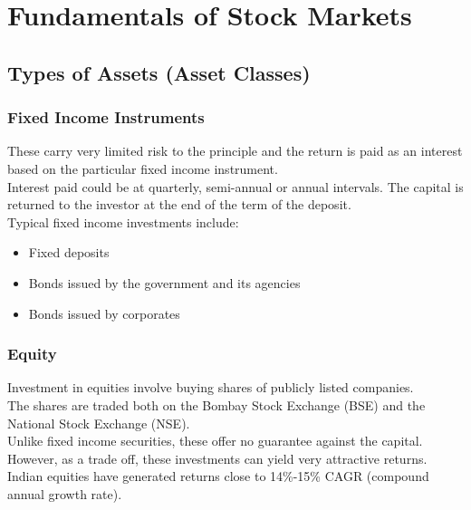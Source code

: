 \chapter{Fundamentals of Stock Markets}
\section{Types of Assets (Asset Classes)}


\subsection{Fixed Income Instruments}
These carry very limited risk to the principle and the return is paid as an interest based on the particular fixed income instrument.
\\
Interest paid could be at quarterly, semi-annual or annual intervals.
The capital is returned to the investor at the end of the term of the deposit.
\\
Typical fixed income investments include:
\begin{itemize}
  \item Fixed deposits
  \item Bonds issued by the government and its agencies
  \item Bonds issued by corporates
\end{itemize}

\subsection{Equity}
Investment in equities involve buying shares of publicly listed companies.
\\
The shares are traded both on the Bombay Stock Exchange (BSE) and the National Stock Exchange (NSE).
\\
Unlike fixed income securities, these offer no guarantee against the capital. However, as a trade off, these investments can yield very attractive returns. Indian equities have generated returns close to 14\%-15\% CAGR (compound annual growth rate).

